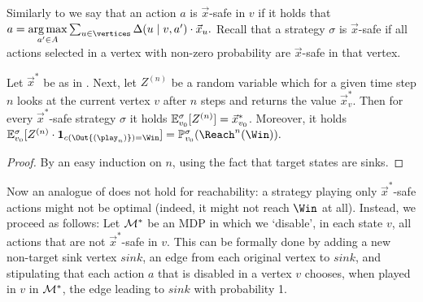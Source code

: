 Similarly to  we say that an action $a$ is $\vec{x}$-safe in $v$ if it holds that $a= \underset{a' \in \actions}{\arg\max} \sum_{u\in \vertices} 
\probTranFunc(u\mid v,a') \cdot\vec{x}_u.$ Recall that a strategy $\sigma$ is $\vec{x}$-safe if all actions selected in a vertex with non-zero probability are $\vec{x}$-safe in that vertex. 

\begin{lemma}
\label{5-lem:quant-reach-value-distribution}
Let $ \vec{x}^* $ be as in . 
Next, let $Z^{(n)}$ be a random variable which for a given time step $n$ looks at the current vertex $v$ after $n$ steps and returns the value $\vec{x}^*_v$. Then for every $\vec{x}^*$-safe strategy $\sigma$ it holds $\mathbb{E}^\sigma_{v_0}[Z^{(n)}] = \vec{x}^*_{v_0}$. Moreover, it holds $\expv^\sigma_{\vinit}[Z^{(n)}\cdot \indicator{\colouring{(\Out{(\play_{n})})}=\Win}] = \probm^\sigma_{\vinit}(\Reach^n(\Win)).$
\end{lemma}
\begin{proof}
By an easy induction on $n$, using the fact that target states are  sinks.
\end{proof}



Now an analogue of  does not hold for reachability: a strategy playing only $\vec{x}^*$-safe actions might not be optimal (indeed, it might not reach $\Win$ at all). Instead, we proceed as follows: Let $\mathcal{M}^*$ be an MDP in which we `disable', in each state $v$, all actions that are not $\vec{x}^*$-safe in $v$. This can be formally done by adding a new non-target sink vertex $ \mathit{sink} $, an edge from each original vertex to $ \mathit{sink} $, and stipulating that each action $a$ that is disabled in a vertex $ v $ chooses, when played in $ v $ in $ \mathcal{M}^*$, the edge leading to $ \mathit{sink} $ with probability 1. 

